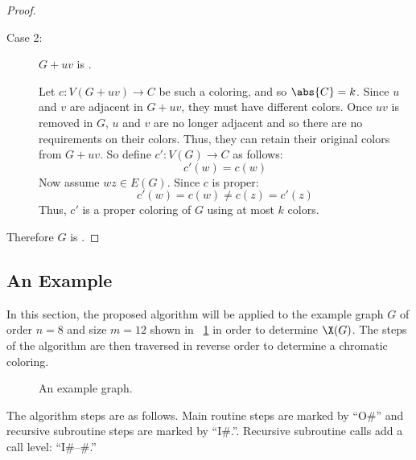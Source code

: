 \begin{proof}
\begin{description}
  \item [Case 2:] \(G+uv\) is .

    Let \(c:V(G+uv)\to C\) be such a coloring, and so \(\abs{C}=k\).  Since \(u\) and \(v\) are adjacent in
    \(G+uv\), they must have different colors.  Once \(uv\) is removed in \(G\), \(u\) and \(v\) are no longer
    adjacent and so there are no requirements on their colors.  Thus, they can retain their original colors from
    \(G+uv\).  So define \(c':V(G)\to C\) as follows:
    \[c'(w)=c(w)\]
    Now assume \(wz\in E(G)\).  Since \(c\) is proper:
    \[c'(w)=c(w)\ne c(z)=c'(z)\]
    Thus, \(c'\) is a proper coloring of \(G\) using at most \(k\) colors.
  \end{description}

  Therefore \(G\) is .
\end{proof}

\subsection{An Example}\label{sec:sub:example}

In this section, the proposed algorithm will be applied to the example graph \(G\) of order \(n=8\) and size
\(m=12\) shown in \figurename~\ref{fig:example} in order to determine \(\X(G)\).  The steps of the algorithm are
then traversed in reverse order to determine a chromatic coloring.

\begin{figure}[H]
  \centering
  \caption{An example graph.}
  \label{fig:example}
\end{figure}

The algorithm steps are as follows.  Main routine steps are marked by ``O\#'' and recursive subroutine steps are
marked by ``I\#.''.  Recursive subroutine calls add a call level: ``I\#--\#.''

